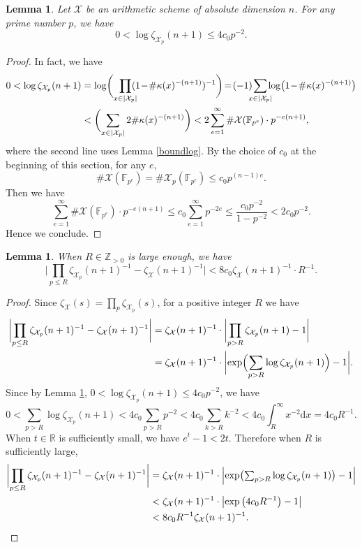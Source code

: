 \documentclass[JEP,XML,SOM,Unicode,published]{cedram}
\theoremstyle{plain}
\newtheorem{lem}[thm]{Lemma}
\theoremstyle{definition}
\newcommand{\X}{\mathcal{X}}
\newcommand{\Z}{\mathbb{Z}}
\newcommand{\R}{\mathbb{R}}
\newcommand{\F}{\mathbb{F}}
\begin{document}
\begin{lem}\label{boundXp}
Let $\X$ be an arithmetic scheme of absolute dimension $n$. For any prime number $p$, we have
\[
0<\log\zeta_{\X_p}(n+1)\leq 4c_0p^{-2}.
\]
\end{lem}
\begin{proof}
In fact, we have
\begin{align*}
0<\log\zeta_{\X_p}(n+1) &=\log \biggl(\prod_{x\in |\X_p|}\hspace*{-2mm}(1\!-\!\#\kappa(x)^{-(n+1)})^{-1} \biggr) \!=\!(-1) \hspace*{-2mm}\sum_{x\in |\X_p|} \hspace*{-2mm}\log \bigl(1\!-\!\#\kappa(x)^{-(n+1)} \bigr) \\
&<\biggl(\sum_{x\in |\X_p|} 2\#\kappa(x)^{-(n+1)} \biggr) < 2\sum_{e=1}^{\infty}\#\X(\mathbb{F}_{p^e})\cdot p^{-e(n+1)},
\end{align*}
where the second line uses Lemma \ref{boundlog}.
By the choice of $c_0$ at the beginning of this section, for any $e$,
\[
\#\X(\F_{p^e})=\#\X_{p}(\F_{p^e})\leq c_0p^{(n-1)e}.
\]
Then we have
\[
\sum_{e=1}^{\infty}\#\X(\mathbb{F}_{p^e})\cdot p^{-e(n+1)} \leq c_0\sum_{e=1}^{\infty} p^{-2e}\leq \frac{c_0p^{-2}}{1-p^{-2}}<2c_0p^{-2}.
\]
Hence we conclude.
\end{proof}

\begin{lem}\label{zetaintegral}
When $R\in \Z_{>0}$ is large enough, we have
\[
\biggl | \prod_{p\leq R}\zeta_{\X_p}(n+1)^{-1}-\zeta_\X(n+1)^{-1} \biggr| < 8c_0 \zeta_\X(n+1)^{-1}\cdot R^{-1}.
\]
\end{lem}
\begin{proof}
Since $\zeta_{\X}(s)=\prod_p\zeta_{\X_p}(s)$, for a positive integer $R$ we have
\begin{align*}
\biggl | \prod_{p\leq R}\zeta_{\X_p}(n+1)^{-1}-\zeta_\X(n+1)^{-1} \biggr|& = \zeta_\X(n+1)^{-1}\cdot \biggl| \prod_{p>R}\zeta_{\X_p}(n+1)-1 \biggr|\\
&= \zeta_\X(n+1)^{-1}\cdot \biggl| \exp\Bigl(\sum_{p>R}\log\zeta_{\X_p}(n+1)\Bigr)-1 \biggr|.
\end{align*}
Since by Lemma \ref{boundXp}, $0<\log\zeta_{\X_p}(n+1)\leq 4c_0p^{-2}$, we have
\[
0<\sum_{p>R}\log\zeta_{\X_p}(n+1) < 4c_0\sum_{p>R}p^{-2}<4c_0\sum_{k>R}k^{-2}< 4c_0\int_{R}^{\infty}x^{-2}\mathrm{d}x= 4c_0 R^{-1}.
\]
When $t\in \R$ is sufficiently small, we have $e^t-1<2t$. Therefore when $R$ is sufficiently large,
\begin{align*}
\biggl| \prod_{p\leq R}\zeta_{\X_p}(n+1)^{-1}-\zeta_\X(n+1)^{-1} \biggr| &= \zeta_\X(n+1)^{-1}\cdot \Bigl| \exp\bigl(\textstyle\sum_{p>R}\log\zeta_{\X_p}(n+1)\bigr)-1 \Bigr|\\
&< \zeta_\X(n+1)^{-1}\cdot \left| \exp\left(4c_0 R^{-1}\right)-1 \right|\\
&<8c_0R^{-1}\zeta_\X(n+1)^{-1}.\qedhere
\end{align*}
\end{proof}
\end{document}
